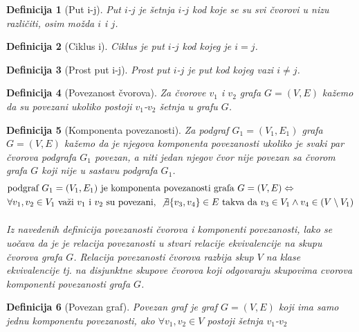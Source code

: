 \documentclass[11pt]{article}
\newtheorem{definition}{Definicija}
\begin{document}
		\begin{definition}[Put i-j]
		Put $i$-$j$ je šetnja $i$-$j$ kod koje se su svi čvorovi u nizu različiti, osim možda $i$ i $j$.
		\end{definition}
		
		\begin{definition}[Ciklus i]
		Ciklus je put $i$-$j$ kod kojeg je $i=j$.
		\end{definition}
		
		\begin{definition}[Prost put i-j]
		Prost put $i$-$j$ je put kod kojeg vazi $i \neq j$.
		\end{definition}
	
		\begin{definition}[Povezanost čvorova]
		Za čvorove $v_1$ i $v_2$ grafa $G = (V, E)$ kažemo da su povezani ukoliko postoji $v_1$-$v_2$ šetnja u grafu $G$. 
		\end{definition}
	
		\begin{definition}[Komponenta povezanosti]
		Za podgraf $G_1 = (V_1, E_1)$ grafa $G = (V, E)$ kažemo da je njegova komponenta povezanosti ukoliko je svaki par čvorova podgrafa $G_1$ povezan, a niti jedan njegov čvor nije povezan sa čvorom grafa $G$ koji nije u sastavu podgrafa $G_1$. 
		\[
			\begin{split}
			&\text{podgraf } G_1 = (V_1, E_1) \text{ je komponenta povezanosti grafa } G = (V, E)  \Leftrightarrow \\
			& \forall v_1,v_2 \in V_1 \text{ važi } v_1 \text{ i } v_2 \text{ su povezani, }  \not \exists \{v_3, v_4\} \in E \text{ takva da } v_3 \in V_1 \land v_4 \in (V \setminus V_1)
			\end{split}
		\]
			\paragraph{}
			Iz navedenih definicija povezanosti čvorova i komponenti povezanosti, lako se uočava da je je relacija povezanosti u stvari relacije ekvivalencije na skupu čvorova grafa $G$. Relacija povezanosti čvorova razbija skup $V$ na klase ekvivalencije tj. na disjunktne skupove čvorova koji odgovaraju skupovima cvorova komponenti povezanosti grafa $G$. 
		\end{definition}
	
		\begin{definition}[Povezan graf]
		Povezan graf je graf $G=(V,E)$ koji ima samo jednu komponentu povezanosti, ako $\forall v_1,v_2 \in V $ postoji šetnja $v_1$-$v_2$
		\end{definition}
	
\end{document}
